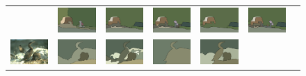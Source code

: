 \begin{figure}
\begin{center}
\begin{tabular}{ c  c  c  c  c  c  c }
&\includegraphics[width=2cm]{fig/visual_result/visual_result_2_3.png}
&\includegraphics[width=2cm]{fig/visual_result/visual_result_2_4.png}
&\includegraphics[width=2cm]{fig/visual_result/visual_result_2_5.png}
&\includegraphics[width=2cm]{fig/visual_result/visual_result_2_6.png}
&\includegraphics[width=2cm]{fig/visual_result/visual_result_2_7.png}
\\
\includegraphics[width=2cm]{fig/visual_result/visual_result_3_1.png}
&\includegraphics[width=2cm]{fig/visual_result/visual_result_3_2.png}
&\includegraphics[width=2cm]{fig/visual_result/visual_result_3_3.png}
&\includegraphics[width=2cm]{fig/visual_result/visual_result_3_4.png}
&\includegraphics[width=2cm]{fig/visual_result/visual_result_3_5.png}

\end{tabular}
\end{center}
\end{figure}
